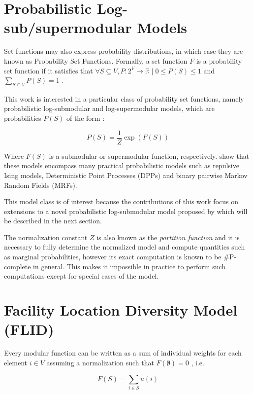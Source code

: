 \section{Probabilistic Log-sub/supermodular Models}

Set functions may also express probability distributions, in which case they are known as Probability Set Functions. Formally, a set function $F$ is a probability set function if it satisfies that  $\forall S \subseteq V, P: 2^V \rightarrow \mathbb{R} \mid 0 \leq P(S) \leq 1$ and $\sum_{S \subseteq V} P(S) = 1$ \citep{bruno99sets}.

This work is interested in a particular class of probability set functions, namely probabilistic log-submodular and log-supermodular models, which are probabilities $P(S)$ of the form \citep{djolonga14variational}:

\begin{equation}
  P(S) = \frac{1}{Z}\exp(F(S))
\end{equation}

Where $F(S)$ is a submodular or supermodular function, respectively. \citet{djolonga14variational, djolonga15scalable} show that these models encompass many practical probabilistic models such as repulsive Ising models, Deterministic Point Processes (DPPs) and binary pairwise Markov Random Fields (MRFs).

This model class is of interest because the contributions of this work focus on extensions to a novel probabilistic log-submodular model proposed by \citet{tschiatschek16learning} which will be described in the next section.

The normalization constant $Z$ is also known as the \textit{partition function} and it is necessary to fully determine the normalized model and compute quantities such as marginal probabilities, however its exact computation is known to be \#P-complete in general\citep{jerrum1990}. This makes it impossible in practice to perform such computations except for special cases of the model.

\section{Facility Location Diversity Model (FLID)}

Every modular function can be written as a sum of individual weights for each element $i \in V$ assuming a normalization such that $F(\emptyset) = 0$ \citep{krause14submodular}, i.e.

\begin{equation}
  F(S) = \sum_{i \in S} u(i)
\end{equation}

